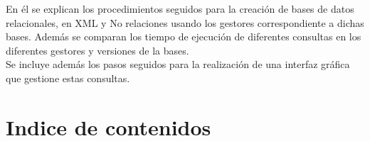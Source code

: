 \documentclass[12pt,a4paper]{article}
\begin{document}
En él se explican los procedimientos seguidos para la creación de bases de datos relacionales, en XML y No relaciones usando los gestores correspondiente a dichas bases. Además se comparan los tiempo de ejecución de diferentes consultas en los diferentes gestores y versiones de la bases.\\

Se incluye además los pasos seguidos para la realización de una interfaz gráfica que gestione estas consultas.




\newpage
\section*{Indice de contenidos}
\end{document}
